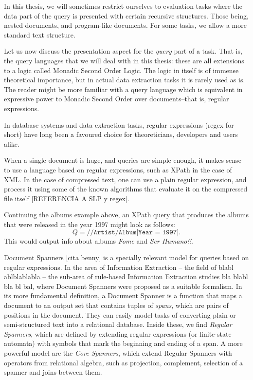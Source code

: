 In this thesis, we will sometimes restrict ourselves to evaluation tasks where the data part of the query is presented with certain recursive structures. Those being, nested documents, and program-like documents. For some tasks, we allow a more standard text structure.

Let us now discuss the presentation aspect for the {\em query} part of a task. That is, the query languages that we will deal with in this thesis: these are all extensions to a logic called Monadic Second Order Logic. The logic in itself is of immense theoretical importance, but in actual data extraction tasks it is rarely used as is. The reader might be more familiar with a query language which is equivalent in expressive power to Monadic Second Order over documents--that is, regular expressions. 

In database systems and data extraction tasks, regular expressions (regex for short) have long been a favoured choice for theoreticians, developers and users alike. 

When a single document is huge, and queries are simple enough, it makes sense to use a language based on regular expressions, such as XPath in the case of XML. In the case of compressed text, one can use a plain regular expression, and process it using some of the known algorithms that evaluate it on the compressed file itself [REFERENCIA A SLP y regex]. 

Continuing the albums example above, an XPath query that produces the albums that were released in the year 1997 might look as follows: 
$$Q = \texttt{//Artist/Album[Year = 1997]}.$$
 This would output info about albums {\it Fome} and {\it Ser Humano!!}.

Document Spanners [cita benny] is a specially relevant model for queries based on regular expressions. In the area of Information Extraction -- the field of blabl ablblablabla -- the sub-area of rule-based Information Extraction studies bla blabl bla bl bal, where Document Spanners were proposed as a suitable formalism.  In its more fundamental definition, a Document Spanner is a function that maps a document to an output set that contains tuples of {\it spans}, which are pairs of positions in the document. They can easily model tasks of converting plain or semi-structured text into a relational database. Inside these, we find {\it Regular Spanners}, which are defined by extending regular expressions (or finite-state automata) with symbols that mark the beginning and ending of a span. A more powerful model are the {\it Core Spanners}, which extend Regular Spanners with operators from relational algebra, such as projection, complement, selection of a spanner and joins between them. 

